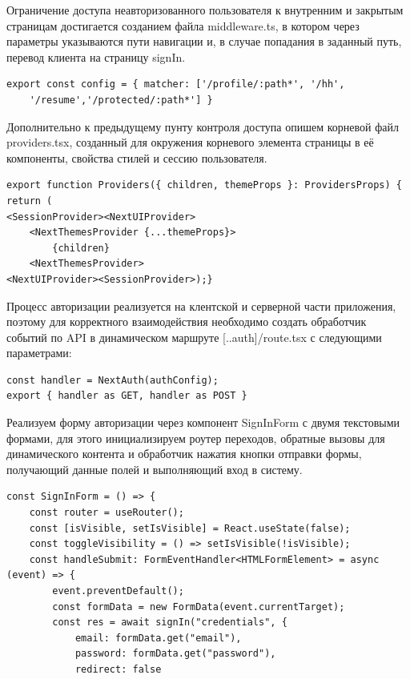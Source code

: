 \documentclass[master, och, diploma]{SCWorks}
\begin{document}
Ограничение доступа неавторизованного пользователя к внутренним и закрытым страницам достигается созданием файла middleware.ts, в котором через параметры указываются пути навигации и, в случае попадания в заданный путь, перевод клиента на страницу signIn.
\begin{verbatim}
export const config = { matcher: ['/profile/:path*', '/hh', 
    '/resume','/protected/:path*'] }
\end{verbatim}

Дополнительно к предыдущему пунту контроля доступа опишем корневой файл providers.tsx, созданный для окружения корневого элемента страницы в её компоненты, свойства стилей и сессию пользователя.
\begin{verbatim}
export function Providers({ children, themeProps }: ProvidersProps) {
return (
<SessionProvider><NextUIProvider>
    <NextThemesProvider {...themeProps}>
        {children}
    <NextThemesProvider>
<NextUIProvider><SessionProvider>);}    
\end{verbatim}

Процесс авторизации реализуется на клентской и серверной части приложения, поэтому для корректного взаимодействия необходимо создать обработчик событий по API в динамическом маршруте [..auth]/route.tsx с следующими параметрами:
\begin{verbatim}
const handler = NextAuth(authConfig);
export { handler as GET, handler as POST }
\end{verbatim}

Реализуем форму авторизации через компонент SignInForm с двумя текстовыми формами, для этого инициализируем роутер переходов, обратные вызовы для динамического контента и обработчик нажатия кнопки отправки формы, получающий данные полей и выполняющий вход в систему.
\begin{verbatim}
const SignInForm = () => {
    const router = useRouter();
    const [isVisible, setIsVisible] = React.useState(false);
    const toggleVisibility = () => setIsVisible(!isVisible);
    const handleSubmit: FormEventHandler<HTMLFormElement> = async (event) => {
        event.preventDefault();
        const formData = new FormData(event.currentTarget);
        const res = await signIn("credentials", {
            email: formData.get("email"),
            password: formData.get("password"),
            redirect: false
\end{verbatim}
\end{document}
